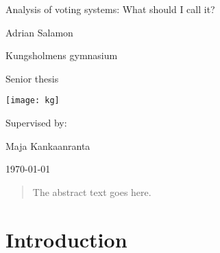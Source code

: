 
\usepackage{hyperref}
\usepackage{float}
\usepackage{amsmath}
\usepackage{mathtools}

\newcommand\tab[1][1cm]{\hspace*{#1}}


\hypersetup{
	colorlinks,
	citecolor=black,
	filecolor=black,
	linkcolor=black,
	urlcolor=black
}
\usepackage{pseudocode}

\usepackage{xcolor}
\usepackage{tikz}
\usepackage{pgfplots}
\pgfplotsset{compat=1.14}







\begin{titlepage}
	\centering
	\vspace{2cm}
	{\Huge Analysis of voting systems: What should I call it? \par}
	\vspace{0.6cm}
	{\LARGE Adrian Salamon\par}

	\vspace{0.6cm}
	{\Large Kungsholmens gymnasium\par}
	\vspace{0.4cm}
	{\large Senior thesis\par}
	\vspace{0.6cm}
	\texttt{[image: kg]}\par\vspace{1cm}
	\vspace{4cm}
	\vfill
	Supervised by: \par
	Maja Kankaanranta

	\vfill

	{\large \today\par}
\end{titlepage}

\pagebreak

\begin{abstract}
	The abstract text goes here.
\end{abstract}

\pagebreak

\tableofcontents

\pagebreak

\section{Introduction}
